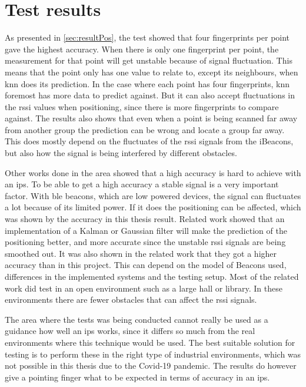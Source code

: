 \section{Test results}\label{sec:discussionResult}
As presented in \cref{sec:resultPos}, the test showed that four fingerprints per point gave the highest accuracy.
When there is only one fingerprint per point, the measurement for that point will get unstable because of signal fluctuation.
This means that the point only has one value to relate to, except its neighbours, when \acrshort{knn} does its prediction.
In the case where each point has four fingerprints, \acrshort{knn} foremost has more data to predict against.
But it can also accept fluctuations in the \acrshort{rssi} values when positioning, since there is more fingerprints to compare against.
The results also shows that even when a point is being scanned far away from another group the prediction can be wrong and locate a group far away.
This does mostly depend on the fluctuates of the \acrshort{rssi} signals from the iBeacons, but also how the signal is being interfered by different obstacles.

\bigskip

Other works done in the area showed that a high accuracy is hard to achieve with an \acrshort{ips}.
To be able to get a high accuracy a stable signal is a very important factor.
With \acrshort{ble} beacons, which are low powered devices, the signal can fluctuates a lot because of its limited power.
If it does the positioning can be affected, which was shown by the accuracy in this thesis result.
Related work  showed that an implementation of a Kalman or Gaussian filter will make the prediction of the positioning better, and more accurate since the unstable \acrshort{rssi} signals are being smoothed out.
It was also shown in the related work that they got a higher accuracy than in this project.
This can depend on the model of Beacons used, differences in the implemented systems and the testing setup.
Most of the related work did test in an open environment such as a large hall or library.
In these environments there are fewer obstacles that can affect the \acrshort{rssi} signals.

\bigskip

The area where the tests was being conducted cannot really be used as a guidance how well an \acrshort{ips} works, since it differs so much from the real environments where this technique would be used.
The best suitable solution for testing is to perform these in the right type of industrial environments, which was not possible in this thesis due to the Covid-19 pandemic.
The results do however give a pointing finger what to be expected in terms of accuracy in an \acrshort{ips}.


